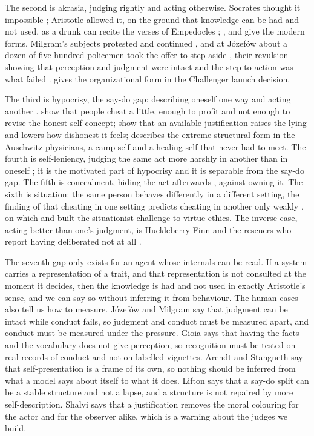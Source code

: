 \documentclass[11pt]{article}
\begin{document}
The second is akrasia, judging rightly and acting otherwise. Socrates thought it impossible \citep{plato_protagoras};
Aristotle allowed it, on the ground that knowledge can be had and not used, as a drunk can recite the verses of
Empedocles \citep[VII.3]{aristotle_ne}; \citet{davidson1970}, \citet{hare1963} and \citet{holton2009} give the modern
forms. Milgram's subjects protested and continued \citep{milgram1963,burger2009}, and at J\'ozef\'ow about a dozen of
five hundred policemen took the offer to step aside \citep{browning1992}, their revulsion showing that perception and
judgment were intact and the step to action was what failed \citep[for the opposing reading see][]{goldhagen1996}.
\citet{vaughan1996} gives the organizational form in the Challenger launch decision.

The third is hypocrisy, the say-do gap: describing oneself one way and acting another \citep{batson1997,batson1999}.
\citet{mazar2008} show that people cheat a little, enough to profit and not enough to revise the honest self-concept;
\citet{shalvi2011} show that an available justification raises the lying and lowers how dishonest it feels;
\citet{lifton1986} describes the extreme structural form in the Auschwitz physicians, a camp self and a healing self
that never had to meet. The fourth is self-leniency, judging the same act more harshly in another than in oneself
\citep{valdesolo2007,valdesolo2008,monin2001}; it is the motivated part of hypocrisy and it is separable from the say-do
gap. The fifth is concealment, hiding the act afterwards \citep{bok1978}, against owning it. The sixth is situation:
the same person behaves differently in a different setting, the finding of \citet{hartshorne1928} that cheating in one
setting predicts cheating in another only weakly \citep[see also][]{burton1963,mischel1968}, on which \citet{doris2002}
and \citet{harmanG1999} built the situationist challenge to virtue ethics. The inverse case, acting better than one's
judgment, is Huckleberry Finn \citep{bennett1974,arpaly2003} and the rescuers who report having deliberated not at all
\citep{oliner1988,hallie1979,glover1999}.

The seventh gap only exists for an agent whose internals can be read. If a system carries a representation of a
trait, and that representation is not consulted at the moment it decides, then the knowledge is had and not used in
exactly Aristotle's sense, and we can say so without inferring it from behaviour. The human cases also tell us how to
measure. J\'ozef\'ow and Milgram say that judgment can be intact while conduct fails, so judgment and conduct must be
measured apart, and conduct must be measured under the pressure. Gioia says that having the facts and the vocabulary
does not give perception, so recognition must be tested on real records of conduct and not on labelled vignettes.
Arendt and Stangneth say that self-presentation is a frame of its own, so nothing should be inferred from what a
model says about itself to what it does. Lifton says that a say-do split can be a stable structure and not a lapse,
and a structure is not repaired by more self-description. Shalvi says that a justification removes the moral
colouring for the actor and for the observer alike, which is a warning about the judges we build.
\end{document}
